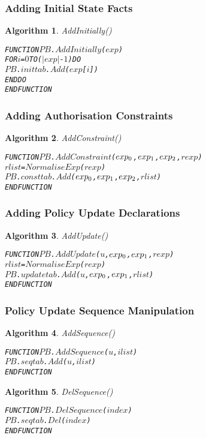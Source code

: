\documentclass[11pt]{report}
\newenvironment{vverbatim}
{
  \begin{alltt}
}
{
    \vspace{-\baselineskip}
  \end{alltt}
}
\newtheorem{vvalgorithm}{Algorithm}[chapter]
\newenvironment{valgorithm}[2]
{
  \begin{vvalgorithm}{#1}
    \label{#2}
    \small
    \begin{vverbatim}
}
{
    \end{vverbatim}
  \end{vvalgorithm}
}
\begin{document}
        \subsubsection{Adding Initial State Facts}

          \begin{valgorithm}{AddInitially()}{algo-impln-adini}
FUNCTION \(PB\).\(AddInitially\)(\(exp\))
  FOR \(i\) = \(0\) TO (\(|exp|\) - \(1\)) DO
    \(PB\).\(inittab\).\(Add\)(\(exp\)[\(i\)])
  ENDDO
ENDFUNCTION
          \end{valgorithm}

        \subsubsection{Adding Authorisation Constraints}

          \begin{valgorithm}{AddConstraint()}{algo-impln-adcon}
FUNCTION \(PB\).\(AddConstraint\)(\(exp\sb{0}\), \(exp\sb{1}\), \(exp\sb{2}\), \(rexp\))
  \(rlist\) = \(NormaliseExp\)(\(rexp\))
  \(PB\).\(consttab\).\(Add\)(\(exp\sb{0}\), \(exp\sb{1}\), \(exp\sb{2}\), \(rlist\))
ENDFUNCTION
          \end{valgorithm}

        \subsubsection{Adding Policy Update Declarations}

          \begin{valgorithm}{AddUpdate()}{algo-impln-adupd}
FUNCTION \(PB\).\(AddUpdate\)(\(u\), \(exp\sb{0}\), \(exp\sb{1}\), \(rexp\))
  \(rlist\) = \(NormaliseExp\)(\(rexp\))
  \(PB\).\(updatetab\).\(Add\)(\(u\), \(exp\sb{0}\), \(exp\sb{1}\), \(rlist\))
ENDFUNCTION
          \end{valgorithm}

        \subsubsection{Policy Update Sequence Manipulation}

          \begin{valgorithm}{AddSequence()}{algo-impln-adseq}
FUNCTION \(PB\).\(AddSequence\)(\(u\), \(ilist\))
  \(PB\).\(seqtab\).\(Add\)(\(u\), \(ilist\))
ENDFUNCTION
          \end{valgorithm}

          \begin{valgorithm}{DelSequence()}{algo-impln-deseq}
FUNCTION \(PB\).\(DelSequence\)(\(index\))
  \(PB\).\(seqtab\).\(Del\)(\(index\))
ENDFUNCTION
          \end{valgorithm}
\end{document}
